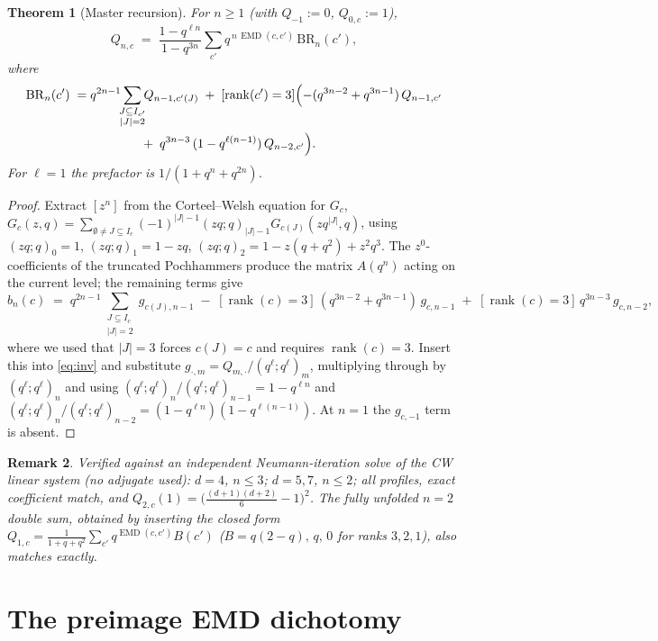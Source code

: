 \documentclass[11pt]{article}
\newtheorem{theorem}{Theorem}
\newtheorem{remark}[theorem]{Remark}
\newcommand{\EMD}{\operatorname{EMD}}
\newcommand{\rk}{\operatorname{rank}}
\begin{document}
\begin{theorem}[Master recursion]\label{thm:master}
For $n\ge 1$ (with $Q_{-1}:=0$, $Q_{0,c}:=1$),
\[
Q_{n,c}\;=\;\frac{1-q^{\ell n}}{1-q^{3n}}
\sum_{c'} q^{\,n\,\EMD(c,c')}\,\mathrm{BR}_n(c'),
\]
where
\begin{align*}
\mathrm{BR}_n(c') \;=\;& q^{2n-1}\!\!\sum_{\substack{J\subseteq I_{c'}\\ |J|=2}}\!\! Q_{n-1,c'(J)}
\;+\;[\rk(c')=3]\Bigl(-(q^{3n-2}+q^{3n-1})\,Q_{n-1,c'}\\
&\qquad\qquad +\;q^{3n-3}\,(1-q^{\ell(n-1)})\,Q_{n-2,c'}\Bigr).
\end{align*}
For $\ell=1$ the prefactor is $1/(1+q^n+q^{2n})$.
\end{theorem}

\begin{proof}
Extract $[z^n]$ from the Corteel--Welsh equation for $G_c$,
$G_c(z,q)=\sum_{\emptyset\ne J\subseteq I_c}(-1)^{|J|-1}(zq;q)_{|J|-1}
G_{c(J)}(zq^{|J|},q)$, using $(zq;q)_0=1$, $(zq;q)_1=1-zq$,
$(zq;q)_2=1-z(q+q^2)+z^2q^3$. The $z^0$-coefficients of the truncated
Pochhammers produce the matrix $A(q^n)$ acting on the current level; the
remaining terms give
\[
b_n(c)\;=\;q^{2n-1}\!\!\sum_{\substack{J\subseteq I_c\\|J|=2}}\!\! g_{c(J),n-1}
\;-\;[\rk(c)=3]\,(q^{3n-2}+q^{3n-1})\,g_{c,n-1}
\;+\;[\rk(c)=3]\,q^{3n-3}\,g_{c,n-2},
\]
where we used that $|J|=3$ forces $c(J)=c$ and requires $\rk(c)=3$.
Insert this into \eqref{eq:inv} and substitute
$g_{\cdot,m}=Q_{m,\cdot}/(q^\ell;q^\ell)_m$, multiplying through by
$(q^\ell;q^\ell)_n$ and using
$(q^\ell;q^\ell)_n/(q^\ell;q^\ell)_{n-1}=1-q^{\ell n}$ and
$(q^\ell;q^\ell)_n/(q^\ell;q^\ell)_{n-2}=(1-q^{\ell n})(1-q^{\ell(n-1)})$.
At $n=1$ the $g_{c,-1}$ term is absent.
\end{proof}

\begin{remark}
Verified against an independent Neumann-iteration solve of the CW linear
system (no adjugate used): $d=4$, $n\le3$; $d=5,7$, $n\le2$; all profiles,
exact coefficient match, and $Q_{2,c}(1)=\bigl(\tfrac{(d+1)(d+2)}{6}-1\bigr)^2$.
The fully unfolded $n=2$ double sum, obtained by inserting the closed form
$Q_{1,c}=\frac{1}{1+q+q^2}\sum_{c'}q^{\EMD(c,c')}B(c')$
($B=q(2-q),\,q,\,0$ for ranks $3,2,1$), also matches exactly.
\end{remark}

\section{The preimage EMD dichotomy}
\end{document}
